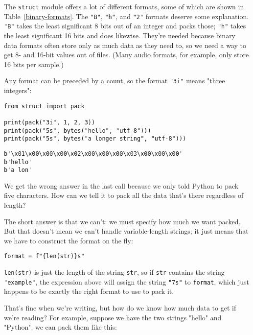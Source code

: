 \documentclass{scrbook}
\newcommand{\tblref}[1]{Table~\ref{#1}}
\begin{document}
The \texttt{struct} module offers a lot of different formats,
some of which are shown in \tblref{binary-formats}.
The \texttt{"B"}, \texttt{"h"}, and \texttt{"2"} formats deserve some explanation.
\texttt{"B"} takes the least significant 8 bits out of an integer and packs those;
\texttt{"h"} takes the least significant 16 bits and does likewise.
They're needed because binary data formats often store only as much data as they need to,
so we need a way to get 8- and 16-bit values out of files.
(Many audio formats,
for example,
only store 16 bits per sample.)


Any format can be preceded by a count,
so the format \texttt{"3i"} means "three integers":


\begin{lstlisting}[frame=single,frameround=tttt]
from struct import pack

print(pack("3i", 1, 2, 3))
print(pack("5s", bytes("hello", "utf-8")))
print(pack("5s", bytes("a longer string", "utf-8")))
\end{lstlisting}



\begin{lstlisting}[frame=single,frameround=tttt]
b'\x01\x00\x00\x00\x02\x00\x00\x00\x03\x00\x00\x00'
b'hello'
b'a lon'
\end{lstlisting}



We get the wrong answer in the last call
because we only told Python to pack five characters.
How can we tell it to pack all the data that's there regardless of length?


The short answer is that we can't:
we must specify how much we want packed.
But that doesn't mean we can't handle variable-length strings;
it just means that we have to construct the format on the fly:

\begin{lstlisting}[frame=single,frameround=tttt]
format = f"{len(str)}s"
\end{lstlisting}


\texttt{len(str)} is just the length of the string \texttt{str},
so if \texttt{str} contains the string \texttt{"example"},
the expression above will assign the string \texttt{"7s"} to \texttt{format},
which just happens to be exactly the right format to use to pack it.


That's fine when we're writing,
but how do we know how much data to get if we're reading?
For example, suppose we have the two strings "hello" and "Python".
we can pack them like this:
\end{document}
